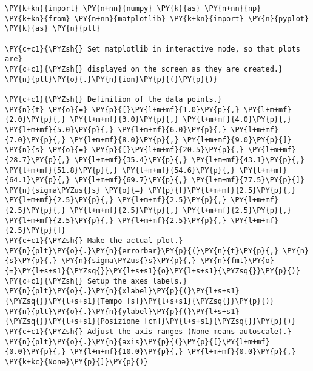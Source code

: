 \begin{Verbatim}[label=\makebox{\href{https://bitbucket.org/lbaldini/statnotes/src/master/snippets/scatter\_plot.py}{https://bitbucket.org/.../scatter\_plot.py}},commandchars=\\\{\}]
\PY{k+kn}{import} \PY{n+nn}{numpy} \PY{k}{as} \PY{n+nn}{np}
\PY{k+kn}{from} \PY{n+nn}{matplotlib} \PY{k+kn}{import} \PY{n}{pyplot} \PY{k}{as} \PY{n}{plt}

\PY{c+c1}{\PYZsh{} Set matplotlib in interactive mode, so that plots are}
\PY{c+c1}{\PYZsh{} displayed on the screen as they are created.}
\PY{n}{plt}\PY{o}{.}\PY{n}{ion}\PY{p}{(}\PY{p}{)}

\PY{c+c1}{\PYZsh{} Definition of the data points.}
\PY{n}{t} \PY{o}{=} \PY{p}{[}\PY{l+m+mf}{1.0}\PY{p}{,} \PY{l+m+mf}{2.0}\PY{p}{,} \PY{l+m+mf}{3.0}\PY{p}{,} \PY{l+m+mf}{4.0}\PY{p}{,} \PY{l+m+mf}{5.0}\PY{p}{,} \PY{l+m+mf}{6.0}\PY{p}{,} \PY{l+m+mf}{7.0}\PY{p}{,} \PY{l+m+mf}{8.0}\PY{p}{,} \PY{l+m+mf}{9.0}\PY{p}{]}
\PY{n}{s} \PY{o}{=} \PY{p}{[}\PY{l+m+mf}{20.5}\PY{p}{,} \PY{l+m+mf}{28.7}\PY{p}{,} \PY{l+m+mf}{35.4}\PY{p}{,} \PY{l+m+mf}{43.1}\PY{p}{,} \PY{l+m+mf}{51.8}\PY{p}{,} \PY{l+m+mf}{54.6}\PY{p}{,} \PY{l+m+mf}{64.1}\PY{p}{,} \PY{l+m+mf}{69.7}\PY{p}{,} \PY{l+m+mf}{77.5}\PY{p}{]}
\PY{n}{sigma\PYZus{}s} \PY{o}{=} \PY{p}{[}\PY{l+m+mf}{2.5}\PY{p}{,} \PY{l+m+mf}{2.5}\PY{p}{,} \PY{l+m+mf}{2.5}\PY{p}{,} \PY{l+m+mf}{2.5}\PY{p}{,} \PY{l+m+mf}{2.5}\PY{p}{,} \PY{l+m+mf}{2.5}\PY{p}{,} \PY{l+m+mf}{2.5}\PY{p}{,} \PY{l+m+mf}{2.5}\PY{p}{,} \PY{l+m+mf}{2.5}\PY{p}{]}
\PY{c+c1}{\PYZsh{} Make the actual plot.}
\PY{n}{plt}\PY{o}{.}\PY{n}{errorbar}\PY{p}{(}\PY{n}{t}\PY{p}{,} \PY{n}{s}\PY{p}{,} \PY{n}{sigma\PYZus{}s}\PY{p}{,} \PY{n}{fmt}\PY{o}{=}\PY{l+s+s1}{\PYZsq{}}\PY{l+s+s1}{o}\PY{l+s+s1}{\PYZsq{}}\PY{p}{)}
\PY{c+c1}{\PYZsh{} Setup the axes labels.}
\PY{n}{plt}\PY{o}{.}\PY{n}{xlabel}\PY{p}{(}\PY{l+s+s1}{\PYZsq{}}\PY{l+s+s1}{Tempo [s]}\PY{l+s+s1}{\PYZsq{}}\PY{p}{)}
\PY{n}{plt}\PY{o}{.}\PY{n}{ylabel}\PY{p}{(}\PY{l+s+s1}{\PYZsq{}}\PY{l+s+s1}{Posizione [cm]}\PY{l+s+s1}{\PYZsq{}}\PY{p}{)}
\PY{c+c1}{\PYZsh{} Adjust the axis ranges (None means autoscale).}
\PY{n}{plt}\PY{o}{.}\PY{n}{axis}\PY{p}{(}\PY{p}{[}\PY{l+m+mf}{0.0}\PY{p}{,} \PY{l+m+mf}{10.0}\PY{p}{,} \PY{l+m+mf}{0.0}\PY{p}{,} \PY{k+kc}{None}\PY{p}{]}\PY{p}{)}
\end{Verbatim}